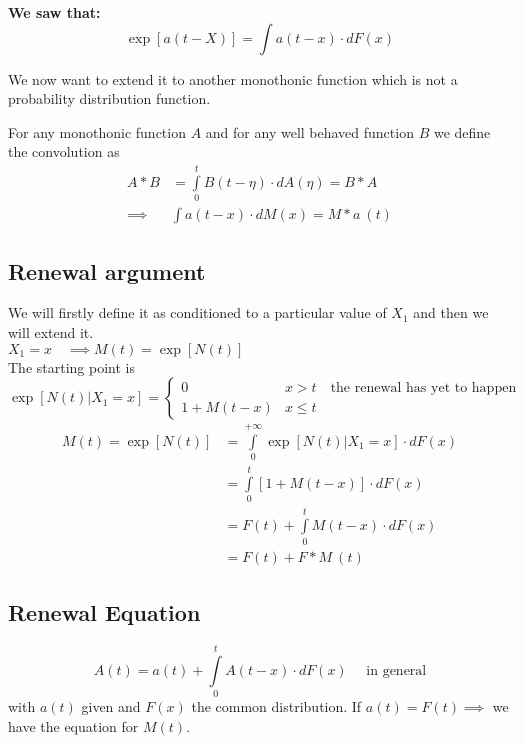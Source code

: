 \textbf{We saw that:}
$$\exp[a(t-X)]=\int a(t-x)\cdot dF(x)$$

We now want to extend it to another monothonic function which is not a probability distribution function.

\begin{definition}[Convolution]
  For any monothonic function $A$ and for any well behaved function $B$ we define the convolution as
  \begin{equation}\begin{split}
    A \ast B &= \int\limits_0^t B(t-\eta)\cdot dA(\eta) = B \ast A \\
    \implies &\int a(t-x)\cdot dM(x) = M \ast a ~(t)
  \end{split}\end{equation}
\end{definition}

\subsection{Renewal argument}
We will firstly define it as conditioned to a particular value of $X_1$ and then we will extend it. \\
$X_1 = x \quad \implies M(t)= \exp[N(t)]$ \\
The starting point is
\begin{equation}
  \exp[N(t)| X_1=x] =
  \begin{cases}
  0 & x>t \quad \text{the renewal has yet to happen}     \\
  1+M(t-x) & x \le t
  \end{cases}
\end{equation}
 \begin{equation}
 	\begin{split}
  M(t)= \exp[N(t)]&=\int\limits_0^{+\infty}\exp[N(t)|X_1=x] \cdot dF(x)\\
   &=\int\limits_0^{t}[1+M(t-x)] \cdot dF(x)\\
   &= F(t) + \int\limits_0^{t}M(t-x) \cdot dF(x)\\
   &= F(t) + F \ast M ~ (t)
	\end{split}
\end{equation}

\subsection{Renewal Equation}

\begin{equation}
    A(t) = a(t) +\int\limits_0^{t}A(t-x) \cdot dF(x) \quad \text{ in general}
\end{equation}
with $a(t)$ given and $F(x)$ the common distribution. If $a(t)=F(t) \implies$ we have the equation for $M(t)$.

